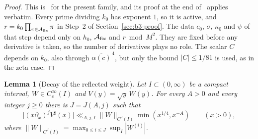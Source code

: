 \documentclass[11pt]{article}
\numberwithin{equation}{section}
\newtheorem{lemma}{Lemma}
\begin{document}
\begin{proof}
This is~\cite[Lemma~6.3]{OAI1112} for the present family, and its proof
at the end of~\cite[App.~A.2]{OAI1112} applies verbatim. Every prime
dividing $k_0$ has exponent $1$, so it is active, and
$r=k_0\prod_{\pi\in\mathcal A_{\rm fix}}\pi$ in Step~2 of
Section~\ref{sec:b3-proof}. The data $c_0$, $\sigma$, $\kappa_0$ and
$\psi$ of that step depend only on $h_0$, $\mathcal A_{\rm fix}$ and $r\bmod M^2$.
They are fixed before any derivative is taken, so the number of
derivatives plays no role. The scalar $C$ depends on $k_0$, also through
$\overline{\alpha(c)}^{\,4}$, but only the bound $|C|\le1/81$ is used,
as in the zeta case.
\end{proof}

\begin{lemma}[Decay of the reflected weight]\label{lem:b3-decay}
Let $I\subset(0,\infty)$ be a compact interval, $W\in C_c^\infty(I)$ and
$V(y)=\sqrt y\,W(y)$. For every $A>0$ and every integer $j\ge0$ there is
$J=J(A,j)$ such that
\begin{equation}\label{eq:d101}
 \bigl|(x\partial_x)^jV^\sharp(x)\bigr|
 \ll_{A,j,I}\|W\|_{C^J(I)}\min(x^{1/4},x^{-A})\qquad(x>0),
\end{equation}
where $\|W\|_{C^J(I)}=\max_{0\le i\le J}\sup_I|W^{(i)}|$.
\end{lemma}
\end{document}
